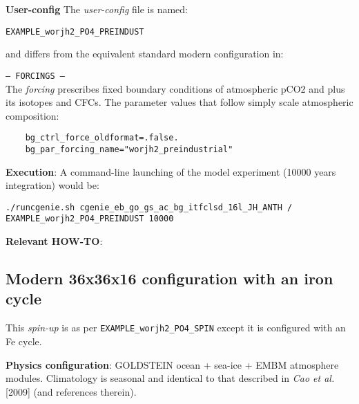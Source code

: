 \documentclass[10pt,twoside]{article}
\begin{document}
\noindent \textbf{User-config} The \textit{user-config} file is named:
\vspace{-10pt}\begin{verbatim}EXAMPLE_worjh2_PO4_PREINDUST\end{verbatim}\vspace{-10pt}
and differs from the equivalent standard modern configuration in:
\begin{compactitem}
	
	\item \texttt{--- FORCINGS ---}
	\\ The \textit{forcing} prescribes fixed boundary conditions of atmospheric pCO2 and plus its isotopes and CFCs.
	The parameter values that follow simply scale atmospheric composition:
	\vspace{-5pt}\begin{verbatim}
	bg_ctrl_force_oldformat=.false.
	bg_par_forcing_name="worjh2_preindustrial"
	\end{verbatim}\vspace{-5pt}

\end{compactitem}

\noindent \textbf{Execution}: A command-line launching of the model experiment (10000 years integration) would be:
\vspace{-10pt}\begin{verbatim}./runcgenie.sh cgenie_eb_go_gs_ac_bg_itfclsd_16l_JH_ANTH /
EXAMPLE_worjh2_PO4_PREINDUST 10000\end{verbatim}\vspace{-5pt}

\noindent \textbf{Relevant HOW-TO}:



\subsection{Modern 36x36x16 configuration with an iron cycle}\label{EXAMPLE_worjh2_PO4Fe_SPIN}

This \textit{spin-up} is as per \texttt{EXAMPLE\_worjh2\_PO4\_SPIN} except it is configured with an Fe cycle.

\noindent \textbf{Physics configuration}: GOLDSTEIN ocean + sea-ice + EMBM atmosphere modules. Climatology is seasonal and identical to that described in \textit{Cao et al.} [2009] (and references therein).
\end{document}
